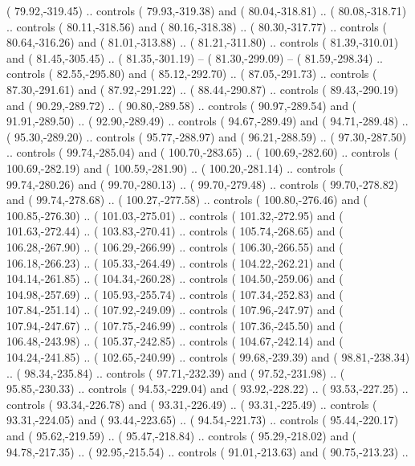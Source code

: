 {        (  79.92,-319.45) .. controls (  79.93,-319.38) and (  80.04,-318.81) ..
        (  80.08,-318.71) .. controls (  80.11,-318.56) and (  80.16,-318.38) ..
        (  80.30,-317.77) .. controls (  80.64,-316.26) and (  81.01,-313.88) ..
        (  81.21,-311.80) .. controls (  81.39,-310.01) and (  81.45,-305.45) ..
        (  81.35,-301.19) -- 
        (  81.30,-299.09) -- 
        (  81.59,-298.34) .. controls (  82.55,-295.80) and (  85.12,-292.70) ..
        (  87.05,-291.73) .. controls (  87.30,-291.61) and (  87.92,-291.22) ..
        (  88.44,-290.87) .. controls (  89.43,-290.19) and (  90.29,-289.72) ..
        (  90.80,-289.58) .. controls (  90.97,-289.54) and (  91.91,-289.50) ..
        (  92.90,-289.49) .. controls (  94.67,-289.49) and (  94.71,-289.48) ..
        (  95.30,-289.20) .. controls (  95.77,-288.97) and (  96.21,-288.59) ..
        (  97.30,-287.50) .. controls (  99.74,-285.04) and ( 100.70,-283.65) ..
        ( 100.69,-282.60) .. controls ( 100.69,-282.19) and ( 100.59,-281.90) ..
        ( 100.20,-281.14) .. controls (  99.74,-280.26) and (  99.70,-280.13) ..
        (  99.70,-279.48) .. controls (  99.70,-278.82) and (  99.74,-278.68) ..
        ( 100.27,-277.58) .. controls ( 100.80,-276.46) and ( 100.85,-276.30) ..
        ( 101.03,-275.01) .. controls ( 101.32,-272.95) and ( 101.63,-272.44) ..
        ( 103.83,-270.41) .. controls ( 105.74,-268.65) and ( 106.28,-267.90) ..
        ( 106.29,-266.99) .. controls ( 106.30,-266.55) and ( 106.18,-266.23) ..
        ( 105.33,-264.49) .. controls ( 104.22,-262.21) and ( 104.14,-261.85) ..
        ( 104.34,-260.28) .. controls ( 104.50,-259.06) and ( 104.98,-257.69) ..
        ( 105.93,-255.74) .. controls ( 107.34,-252.83) and ( 107.84,-251.14) ..
        ( 107.92,-249.09) .. controls ( 107.96,-247.97) and ( 107.94,-247.67) ..
        ( 107.75,-246.99) .. controls ( 107.36,-245.50) and ( 106.48,-243.98) ..
        ( 105.37,-242.85) .. controls ( 104.67,-242.14) and ( 104.24,-241.85) ..
        ( 102.65,-240.99) .. controls (  99.68,-239.39) and (  98.81,-238.34) ..
        (  98.34,-235.84) .. controls (  97.71,-232.39) and (  97.52,-231.98) ..
        (  95.85,-230.33) .. controls (  94.53,-229.04) and (  93.92,-228.22) ..
        (  93.53,-227.25) .. controls (  93.34,-226.78) and (  93.31,-226.49) ..
        (  93.31,-225.49) .. controls (  93.31,-224.05) and (  93.44,-223.65) ..
        (  94.54,-221.73) .. controls (  95.44,-220.17) and (  95.62,-219.59) ..
        (  95.47,-218.84) .. controls (  95.29,-218.02) and (  94.78,-217.35) ..
        (  92.95,-215.54) .. controls (  91.01,-213.63) and (  90.75,-213.23) ..
}
